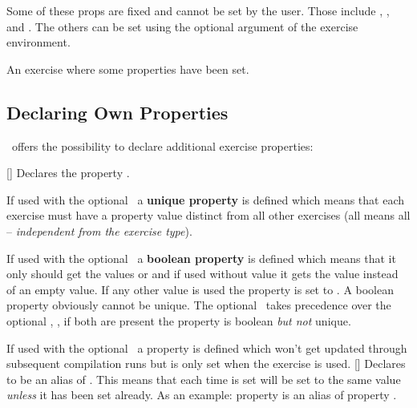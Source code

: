 \documentclass{xsim-manual}
\begin{document}
Some of these \acsp*{prop} are fixed and cannot be set by the user.  Those
include , , and .  The
others can be set using the optional argument of the exercise environment.

\begin{example}
  \begin{exercise}[subtitle={This is a subtitle},points=4,bonus-points=1]
    An exercise where some properties have been set.
  \end{exercise}
\end{example}

\subsection{Declaring Own Properties}

\xsim\ offers the possibility to declare additional exercise properties:
\begin{commands}
  [\barg\sarg\narg{}]
    Declares the property .
    
    If used with the optional \barg\ a \textbf{unique property} is defined
    which means that each exercise must have a property value distinct from
    all other exercises (all means all -- \emph{independent from the exercise
      type}).

    If used with the optional \sarg\ a \textbf{boolean property} is defined
    which means that it only should get the values  or 
    and if used without value it gets the value  instead of an
    empty value.  If any other value is used the property is set to
    .  A boolean property obviously cannot be unique.  The
    optional \sarg\ takes precedence over the optional \barg, \ie, if both are
    present the property is boolean \emph{but not} unique.

    If used with the optional \narg\ a property is defined which won't get
    updated through subsequent compilation runs but is only set when the
    exercise is used.
  []
    Declares  to be an alias of .  This
    means that each time  is set  will be
    set to the same value \emph{unless} it has been set already.  As an
    example: property  is an alias of property .
\end{commands}
\end{document}

